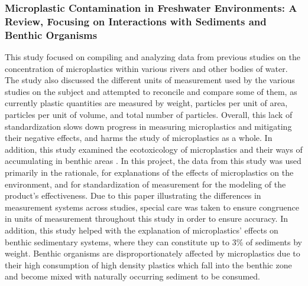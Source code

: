 \documentclass[fleqn,10pt]{SelfArx} %
\begin{document}
	\subsubsection*{Microplastic Contamination in Freshwater Environments: A Review, Focusing on Interactions with Sediments and Benthic Organisms
	}
	This study focused on compiling and analyzing data from previous studies on the concentration of microplastics within various rivers and other bodies of water. The study also discussed the different units of measurement used by the various studies on the subject and attempted to reconcile and compare some of them, as currently plastic quantities are measured by weight, particles per unit of area, particles per unit of volume, and total number of particles. Overall, this lack of standardization slows down progress in measuring microplastics and mitigating their negative effects, and harms the study of microplastics as a whole. In addition, this study examined the ecotoxicology of microplastics and their ways of accumulating in benthic areas \cite{BellasiBenthic}.
	In this project, the data from this study was used primarily in the rationale, for explanations of the effects of microplastics on the environment, and for standardization of measurement for the modeling of the product’s effectiveness. Due to this paper illustrating the differences in measurement systems across studies, special care was taken to ensure congruence in units of measurement throughout this study in order to ensure accuracy. In addition, this study helped with the explanation of microplastics’ effects on benthic sedimentary systems, where they can constitute up to 3\% of sediments by weight. Benthic organisms are disproportionately affected by microplastics due to their high consumption of high density plastics which fall into the benthic zone and become mixed with naturally occurring sediment to be consumed. 
	
\end{document}
